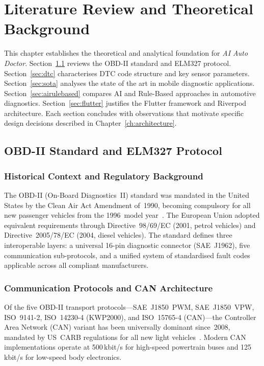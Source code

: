\chapter{Literature Review and Theoretical Background}
\label{ch:litreview}

This chapter establishes the theoretical and analytical foundation for \textit{AI Auto Doctor}.
Section~\ref{sec:obd} reviews the OBD-II standard and ELM327 protocol.
Section~\ref{sec:dtc} characterises DTC code structure and key sensor parameters.
Section~\ref{sec:sota} analyses the state of the art in mobile diagnostic applications.
Section~\ref{sec:airulebased} compares AI and Rule-Based approaches in automotive diagnostics.
Section~\ref{sec:flutter} justifies the Flutter framework and Riverpod architecture.
Each section concludes with observations that motivate specific design decisions described in Chapter~\ref{ch:architecture}.

\section{OBD-II Standard and ELM327 Protocol}
\label{sec:obd}

\subsection{Historical Context and Regulatory Background}

The OBD-II (On-Board Diagnostics~II) standard was mandated in the United States by the Clean Air Act Amendment of~1990, becoming compulsory for all new passenger vehicles from the 1996~model year~\cite{sae2020}.
The European Union adopted equivalent requirements through Directive~98/69/EC (2001, petrol vehicles) and Directive~2005/78/EC (2004, diesel vehicles).
The standard defines three interoperable layers: a universal 16-pin diagnostic connector (SAE~J1962), five communication sub-protocols, and a unified system of standardised fault codes applicable across all compliant manufacturers.

\subsection{Communication Protocols and CAN Architecture}

Of the five OBD-II transport protocols---SAE~J1850~PWM, SAE~J1850~VPW, ISO~9141-2, ISO~14230-4 (KWP2000), and ISO~15765-4 (CAN)---the Controller Area Network (CAN) variant has been universally dominant since~2008, mandated by US~CARB regulations for all new light vehicles~\cite{iso2021}.
Modern CAN implementations operate at 500\,kbit/s for high-speed powertrain buses and 125\,kbit/s for low-speed body electronics.

